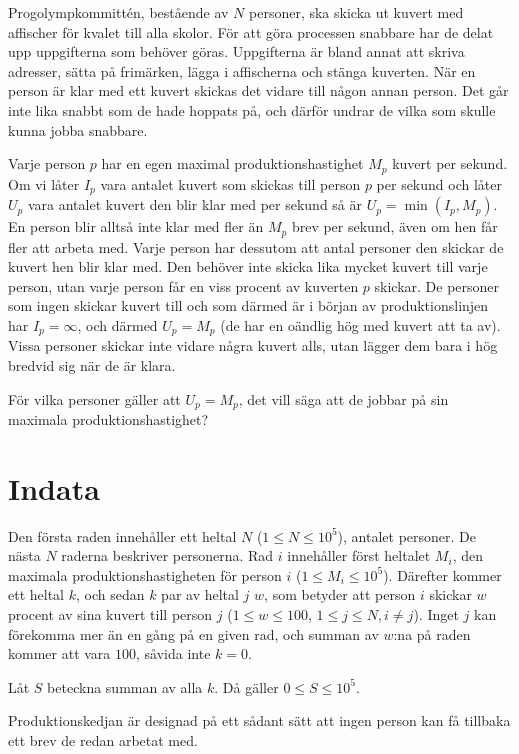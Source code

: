 Progolympkommittén, bestående av $N$ personer, ska skicka ut kuvert med affischer för kvalet till alla skolor.
För att göra processen snabbare har de delat upp uppgifterna som behöver göras.
Uppgifterna är bland annat att skriva adresser, sätta på frimärken, lägga i affischerna och stänga kuverten.
När en person är klar med ett kuvert skickas det vidare till någon annan person.
Det går inte lika snabbt som de hade hoppats på, och därför undrar de vilka som skulle kunna jobba snabbare.

Varje person $p$ har en egen maximal produktionshastighet $M_p$ kuvert per sekund.
Om vi låter $I_p$ vara antalet kuvert som skickas till person $p$ per sekund och låter $U_p$ vara antalet kuvert den blir klar med per sekund så är $U_p = \min(I_p, M_p)$.
En person blir alltså inte klar med fler än $M_p$ brev per sekund, även om hen får fler att arbeta med.
Varje person har dessutom att antal personer den skickar de kuvert hen blir klar med.
Den behöver inte skicka lika mycket kuvert till varje person, utan varje person får en viss procent av kuverten $p$ skickar.
De personer som ingen skickar kuvert till och som därmed är i början av produktionslinjen har $I_p = \infty$, och därmed $U_p = M_p$ (de har en oändlig hög med kuvert att ta av).
Vissa personer skickar inte vidare några kuvert alls, utan lägger dem bara i hög bredvid sig när de är klara.

För vilka personer gäller att $U_p = M_p$, det vill säga att de jobbar på sin maximala produktionshastighet?

\section*{Indata}
Den första raden innehåller ett heltal $N$ ($1 \le N \le 10^5$), antalet personer.
De nästa $N$ raderna beskriver personerna. Rad $i$ innehåller först heltalet $M_i$, den maximala produktionshastigheten för person $i$ ($1 \le M_i \le 10^5$).
Därefter kommer ett heltal $k$, och sedan $k$ par av heltal $j$ $w$, som betyder att person $i$ skickar $w$ procent av sina kuvert till person $j$ ($1 \le w \le 100$, $1 \le j \le N, i \neq j$).
Inget $j$ kan förekomma mer än en gång på en given rad, och summan av $w$:na på raden kommer att vara $100$, såvida inte $k = 0$.

Låt $S$ beteckna summan av alla $k$. Då gäller $0 \le S \le 10^5$.

Produktionskedjan är designad på ett sådant sätt att ingen person kan få tillbaka ett brev de redan arbetat med.

